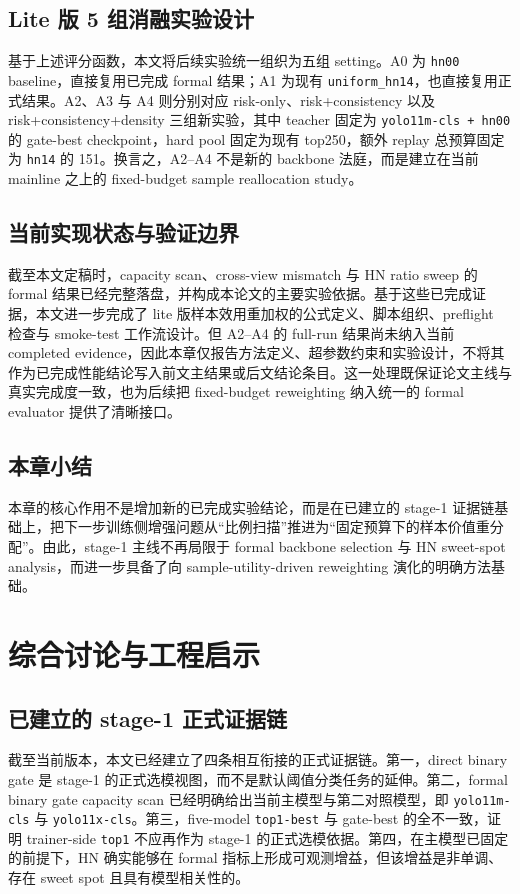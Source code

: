 \documentclass[UTF8,openany,12pt]{ctexbook}
\newcommand{\formalmetric}[1]{\texttt{#1}}
\begin{document}
\section{Lite 版 5 组消融实验设计}
基于上述评分函数，本文将后续实验统一组织为五组 setting。A0 为 \texttt{hn00} baseline，直接复用已完成 formal 结果；A1 为现有 \texttt{uniform\_hn14}，也直接复用正式结果。A2、A3 与 A4 则分别对应 risk-only、risk+consistency 以及 risk+consistency+density 三组新实验，其中 teacher 固定为 \texttt{yolo11m-cls + hn00} 的 gate-best checkpoint，hard pool 固定为现有 top250，额外 replay 总预算固定为 \texttt{hn14} 的 151。换言之，A2--A4 不是新的 backbone 法庭，而是建立在当前 mainline 之上的 fixed-budget sample reallocation study。

\section{当前实现状态与验证边界}
截至本文定稿时，capacity scan、cross-view mismatch 与 HN ratio sweep 的 formal 结果已经完整落盘，并构成本论文的主要实验依据。基于这些已完成证据，本文进一步完成了 lite 版样本效用重加权的公式定义、脚本组织、preflight 检查与 smoke-test 工作流设计。但 A2--A4 的 full-run 结果尚未纳入当前 completed evidence，因此本章仅报告方法定义、超参数约束和实验设计，不将其作为已完成性能结论写入前文主结果或后文结论条目。这一处理既保证论文主线与真实完成度一致，也为后续把 fixed-budget reweighting 纳入统一的 formal evaluator 提供了清晰接口。

\section{本章小结}
本章的核心作用不是增加新的已完成实验结论，而是在已建立的 stage-1 证据链基础上，把下一步训练侧增强问题从“比例扫描”推进为“固定预算下的样本价值重分配”。由此，stage-1 主线不再局限于 formal backbone selection 与 HN sweet-spot analysis，而进一步具备了向 sample-utility-driven reweighting 演化的明确方法基础。

\chapter{综合讨论与工程启示}

\section{已建立的 stage-1 正式证据链}
截至当前版本，本文已经建立了四条相互衔接的正式证据链。第一，direct binary gate 是 stage-1 的正式选模视图，而不是默认阈值分类任务的延伸。第二，formal binary gate capacity scan 已经明确给出当前主模型与第二对照模型，即 \texttt{yolo11m-cls} 与 \texttt{yolo11x-cls}。第三，five-model \formalmetric{top1-best} 与 gate-best 的全不一致，证明 trainer-side \formalmetric{top1} 不应再作为 stage-1 的正式选模依据。第四，在主模型已固定的前提下，HN 确实能够在 formal 指标上形成可观测增益，但该增益是非单调、存在 sweet spot 且具有模型相关性的。
\end{document}
